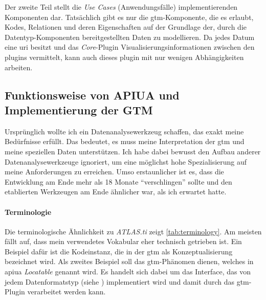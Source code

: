 Der zweite Teil stellt die \textit{Use Cases} (Anwendungsfälle) implementierenden Komponenten dar. Tatsächlich gibt es nur die \gls{gtm}-Komponente, die es erlaubt, Kodes, Relationen und deren Eigenschaften auf der Grundlage der, durch die Datentyp-Komponenten bereitgestellten Daten zu modellieren. Da jedes Datum eine \gls{uri} besitzt und das \textit{Core}-Plugin Visualisierungsinformationen zwischen den \gls{plugin}s vermittelt, kann auch dieses \gls{plugin} mit nur wenigen Abhängigkeiten arbeiten.
  





\subsection{Funktionsweise von APIUA und Implementierung der GTM}
\label{sec:gtm-implementation}

Ursprünglich wollte ich ein Datenanalysewerkzeug schaffen, das exakt meine Bedürfnisse erfüllt. Das bedeutet, es muss meine Interpretation der \gls{gtm} und meine speziellen Daten unterstützen. Ich habe dabei bewusst den Aufbau anderer Datenanalysewerkzeuge ignoriert, um eine möglichst hohe Spezialisierung auf meine Anforderungen zu erreichen. Umso erstaunlicher ist es, dass die Entwicklung am Ende mehr als 18 Monate ``verschlingen'' sollte und den etablierten Werkzeugen am Ende ähnlicher war, als ich erwartet hatte.

\paragraph{Terminologie}

Die terminologische Ähnlichkeit zu \textit{ATLAS.ti} zeigt \autoref{tab:terminology}. Am meisten fällt auf, dass mein verwendetes Vokabular eher technisch getrieben ist. Ein Beispiel dafür ist die Kodeinstanz, die in der \gls{gtm} als Konzeptualisierung bezeichnet wird. Als zweites Beispiel soll das \gls{gtm}-Phänomen dienen, welches in \gls{apiua} \textit{Locatable} genannt wird. Es handelt sich dabei um das Interface, das von jedem Datenformatstyp (siehe ) implementiert wird und damit durch das \gls{gtm}-Plugin verarbeitet werden kann. 


